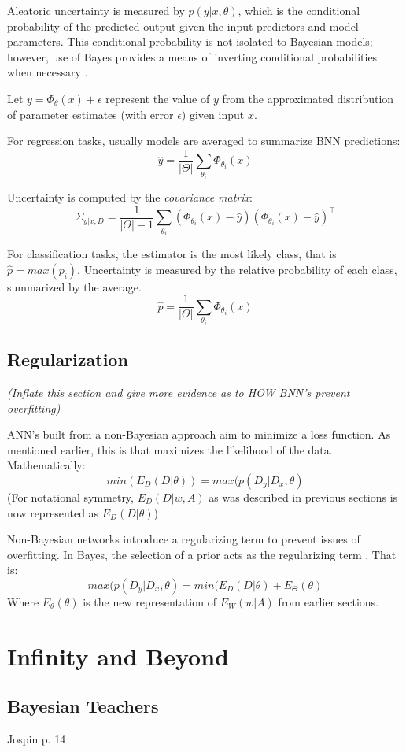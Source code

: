 Aleatoric uncertainty is measured by $p(y|x,\theta)$, which is the conditional probability of the predicted output given the input predictors and model parameters.  This conditional probability is not isolated to Bayesian models; however, use of Bayes provides a means of inverting conditional probabilities when necessary \cite{Jospin}.


Let $y = \Phi_{\theta} (x) + \epsilon$ represent the value of $y$ from the approximated distribution of parameter estimates (with error $\epsilon$) given input $x$.

For regression tasks, usually models are averaged to summarize BNN predictions: 
$$
\hat{y} = \frac{1}{|\Theta|} \sum_{\theta_i} \Phi_{\theta_i}(x)
$$

Uncertainty is computed by the \textit{covariance matrix}:
$$
\Sigma_{y|x,D} = \frac{1}{|\Theta|-1} \sum_{\theta_i} (\Phi_{\theta_i}(x) - \hat{y}) (\Phi_{\theta_i}(x) - \hat{y})^\intercal
$$

For classification tasks, the estimator is the most likely class, that is $\hat{p} = max(p_i)$.  Uncertainty is measured by the relative probability of each class, summarized by the average.
$$
\hat{p} = \frac{1}{|\Theta|} \sum_{\theta_i} \Phi_{\theta_i}(x)
$$

\subsection{Regularization}

\textit{(Inflate this section and give more evidence as to HOW BNN's prevent overfitting)}

ANN's built from a non-Bayesian approach aim to minimize a loss function.  As mentioned earlier, this is that maximizes the likelihood of the data.  Mathematically:
$$
min(E_D(D|\theta)) = max(p(D_y|D_x,\theta)
$$
(For notational symmetry, $E_D(D|w,A)$ as was described in previous sections is now represented as $E_D(D|\theta)$)

Non-Bayesian networks introduce a regularizing term to prevent issues of overfitting.  In Bayes, the selection of a prior acts as the regularizing term \cite{Jospin},  That is:
$$
 max(p(D_y|D_x,\theta) = min(E_D(D|\theta) + E_{\Theta}(\theta)
$$
Where $E_{\theta}(\theta)$ is the new representation of $E_W(w|A)$ from earlier sections.

\section{Infinity and Beyond}

\subsection{Bayesian Teachers}
Jospin p. 14

